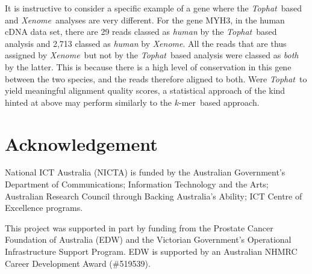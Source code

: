 \documentclass{bioinfo}
\newcommand{\Xenome}{\textit{Xenome}{}}
\newcommand{\Tophat}{\textit{Tophat}{}}
\newcommand{\kmer}{$k$-mer{}}
\begin{document}
It is instructive to consider a specific example of a gene where the \Tophat\ based and \Xenome\ analyses
are very different.
For the gene MYH3, in the human cDNA data set, there are 29 reads classed as \textit{human} by the \Tophat\
based analysis and 2,713 classed as \textit{human} by \Xenome. All the reads that are thus assigned by
\Xenome\ but not by the \Tophat\ based analysis were classed as \textit{both} by the latter. This is because
there is a high level of conservation in this gene between the two species, and the reads therefore
aligned to both.
Were \Tophat\ to yield meaningful alignment quality scores, a statistical approach of the kind hinted at
above may perform similarly to the \kmer\ based approach.


\section*{Acknowledgement}

National ICT Australia (NICTA) is funded by the Australian Government's Department of Communications; 
Information Technology and the Arts;  
Australian Research Council through Backing Australia's Ability; 
ICT Centre of Excellence programs.

This project was supported in part by funding from the Prostate Cancer Foundation of Australia (EDW) and 
the Victorian Government's Operational Infrastructure Support Program. 
EDW is supported by an Australian NHMRC Career Development Award (\#519539).



%
%
%
%
%
%
%




\end{document}
